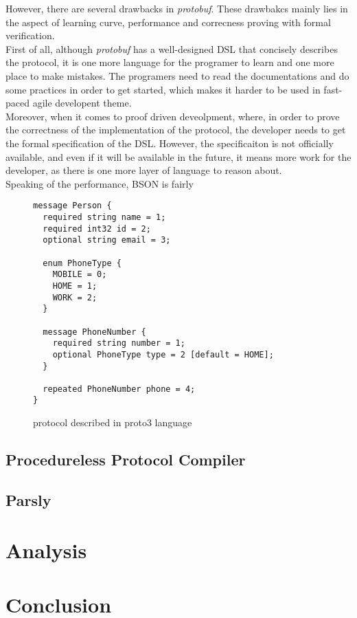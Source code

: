 \documentclass{article}
\begin{document}
However, there are several drawbacks in \textit{protobuf}. These drawbakcs mainly lies in the aspect of learning curve, performance and correcness proving with formal verification.\\

First of all, although \textit{protobuf} has a well-designed DSL that concisely describes the protocol, it is one more language for the programer to learn and one more place to make mistakes. The programers need to read the documentations and do some practices in order to get started, which makes it harder to be used in fast-paced agile developent theme.\\

Moreover, when it comes to proof driven deveolpment, where, in order to prove the correctness of the implementation of the protocol, the developer needs to get the formal specification of the DSL. However, the specificaiton is not officially available, and even if it will be available in the future, it means more work for the developer, as there is one more layer of language to reason about. \\

Speaking of the performance, BSON is fairly 

\begin{figure}
\begin{center}
\lstset{language=c++}
\label{lst:proto3}
\begin{lstlisting}
message Person {
  required string name = 1;
  required int32 id = 2;
  optional string email = 3;

  enum PhoneType {
    MOBILE = 0;
    HOME = 1;
    WORK = 2;
  }

  message PhoneNumber {
    required string number = 1;
    optional PhoneType type = 2 [default = HOME];
  }

  repeated PhoneNumber phone = 4;
}
\end{lstlisting}
\caption{protocol described in proto3 language}
\end{center}
\end{figure}


\subsection{Procedureless Protocol Compiler}

\subsection{Parsly}

\section{Analysis} %


\section{Conclusion} %
\end{document}
